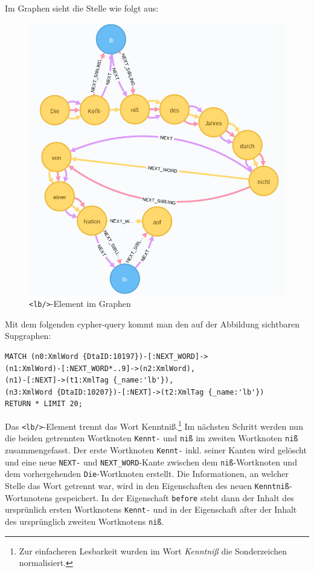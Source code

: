 \documentclass[ngerman,]{scrreprt}
\begin{document}
Im Graphen sieht die Stelle wie folgt aus:

\begin{figure}
\centering
\includegraphics{Bilder/TEI2Graph/lb mit Worttrennung im Graphen.png}
\caption{\texttt{\textless{}lb/\textgreater{}}-Element im Graphen}
\end{figure}

Mit dem folgenden cypher-query kommt man den auf der Abbildung sichtbaren Supgraphen:

\begin{verbatim}
MATCH (n0:XmlWord {DtaID:10197})-[:NEXT_WORD]->
(n1:XmlWord)-[:NEXT_WORD*..9]->(n2:XmlWord),
(n1)-[:NEXT]->(t1:XmlTag {_name:'lb'}),
(n3:XmlWord {DtaID:10207})-[:NEXT]->(t2:XmlTag {_name:'lb'})
RETURN * LIMIT 20;
\end{verbatim}

Das \texttt{\textless{}lb/\textgreater{}}-Element trennt das Wort Kenntniß.\footnote{Zur einfacheren Lesbarkeit wurden im Wort \emph{Kenntniß} die Sonderzeichen normalisiert.} Im nächsten Schritt werden nun die beiden getrennten Wortknoten \texttt{Kennt-} und \texttt{niß} im zweiten Wortknoten \texttt{niß} zusammengefasst. Der erste Wortknoten \texttt{Kennt-} inkl. seiner Kanten wird gelöscht und eine neue \texttt{NEXT-} und \texttt{NEXT\_WORD}-Kante zwischen dem \texttt{niß}-Wortknoten und dem vorhergehenden \texttt{Die}-Wortknoten erstellt. Die Informationen, an welcher Stelle das Wort getrennt war, wird in den Eigenschaften des neuen \texttt{Kenntniß}-Wortnnotens gespeichert. In der Eigenschaft \texttt{before} steht dann der Inhalt des ursprünlich ersten Wortknotens \texttt{Kennt-} und in der Eigenschaft after der Inhalt des ursprünglich zweiten Wortknotens \texttt{niß}.
\end{document}
